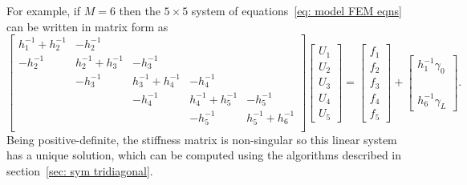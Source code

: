 For example, if $M=6$ then the $5\times 5$ system of 
equations~\eqref{eq: model FEM eqns} can be written in matrix form as
\[
\begin{bmatrix}
 h_1^{-1}+h_2^{-1}&        -h_2^{-1}&&&\\
         -h_2^{-1}&h_2^{-1}+h_3^{-1}&-h_3^{-1}&&\\
        &-h_3^{-1}&h_3^{-1}+h_4^{-1}&-h_4^{-1}&\\
       &&-h_4^{-1}&h_4^{-1}+h_5^{-1}&-h_5^{-1}\\
      &&&-h_5^{-1}&h_5^{-1}+h_6^{-1}\\
\end{bmatrix}
\begin{bmatrix}U_1\\ U_2\\ U_3\\ U_4\\ U_5\end{bmatrix}
=\begin{bmatrix}f_1\\ f_2\\ f_3\\ f_4\\ f_5\end{bmatrix}
+\begin{bmatrix}h_1^{-1}\gamma_0\\ \\ \\ \\ h_6^{-1}\gamma_L\end{bmatrix}.
\]
Being positive-definite, the stiffness matrix is non-singular so this linear 
system has a unique solution, which can be computed using the algorithms 
described in section~\ref{sec: sym tridiagonal}.

